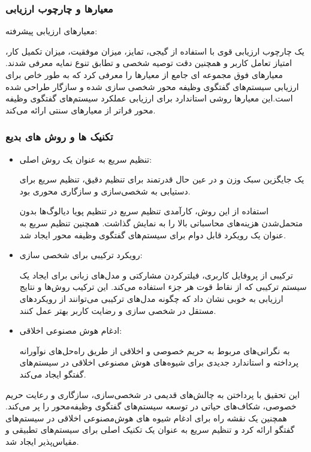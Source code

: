 \subsubsection{معیارها و چارچوب ارزیابی}
معیارهای ارزیابی پیشرفته:

یک چارچوب ارزیابی قوی با استفاده از گیجی، تمایز، میزان موفقیت، میزان تکمیل کار، امتیاز تعامل کاربر و همچنین دقت توصیه شخصی و تطابق تنوع نمایه معرفی شدند.
معیارهای فوق مجموعه ای جامع از معیارها را معرفی کرد که به طور خاص برای ارزیابی سیستم‌های گفتگوی وظیفه محور شخصی سازی شده و سازگار طراحی شده است.این معیارها روشی استاندارد برای ارزیابی عملکرد سیستم‌های گفتگوی وظیفه محور فراتر از معیارهای سنتی ارائه می‌کند.


\subsubsection{تکنیک ها و روش های بدیع}


\begin{itemize}
\item
 تنظیم سریع به عنوان یک روش اصلی:

 یک جایگزین سبک وزن و در عین حال قدرتمند برای تنظیم دقیق، تنظیم سریع برای دستیابی به شخصی‌سازی و سازگاری محوری بود.
 
استفاده از این روش، کارآمدی تنظیم سریع در تنظیم پویا دیالوگ‌ها بدون متحمل‌شدن هزینه‌های محاسباتی بالا را به نمایش گذاشت. همچنین تنظیم سریع به عنوان یک رویکرد قابل دوام برای سیستم‌های گفتگوی وظیفه محور ایجاد شد.

\item
 رویکرد ترکیبی برای شخصی سازی:

 ترکیبی از پروفایل کاربری، فیلترکردن مشارکتی و مدل‌های زبانی برای ایجاد یک سیستم ترکیبی که از نقاط قوت هر جزء استفاده می‌کند. این ترکیب روش‌ها و نتایج ارزیابی به خوبی نشان داد که چگونه مدل‌های ترکیبی می‌توانند از رویکردهای مستقل در شخصی سازی و رضایت کاربر بهتر عمل کنند.

\item
 ادغام هوش مصنوعی اخلاقی:

 به نگرانی‌های مربوط به حریم خصوصی و اخلاقی از طریق راه‌حل‌های نوآورانه پرداخته و استاندارد جدیدی برای شیوه‌های هوش مصنوعی اخلاقی در سیستم‌های گفتگو ایجاد می‌کند.
\end{itemize}


این تحقیق با پرداختن به چالش‌های قدیمی در شخصی‌سازی، سازگاری و رعایت حریم خصوصی، شکاف‌های حیاتی در توسعه سیستم‌های گفتگوی وظیفه‌محور را پر می‌کند. همچنین یک نقشه راه برای ادغام شیوه های هوش‌مصنوعی اخلاقی در سیستم‌های گفتگو ارائه کرد و تنظیم سریع به عنوان یک تکنیک اصلی برای سیستم‌های تطبیقی ​​و مقیاس‌پذیر ایجاد شد.


